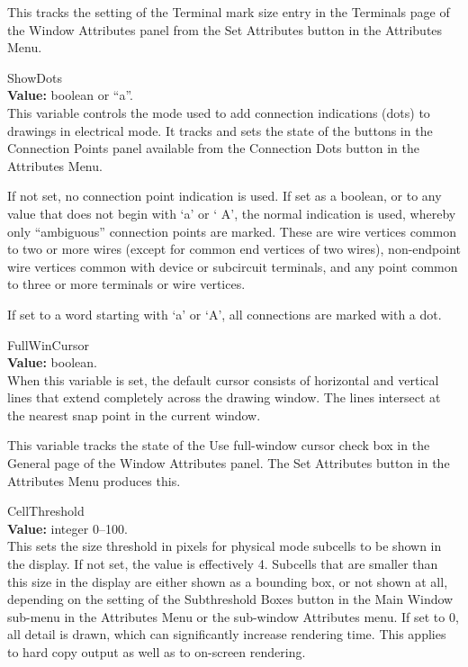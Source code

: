 \begin{description}
This tracks the setting of the {\cb Terminal mark size} entry in the
{\cb Terminals} page of the {\cb Window Attributes} panel from the
{\cb Set Attributes} button in the {\cb Attributes Menu}.

\item{\et ShowDots}\\
{\bf Value:} boolean or ``{\vt a}''.\\
This variable controls the mode used to add connection indications
(dots) to drawings in electrical mode.  It tracks and sets the state
of the buttons in the {\cb Connection Points} panel available from the
{\cb Connection Dots} button in the {\cb Attributes Menu}.

If not set, no connection point indication is used.  If set as a
boolean, or to any value that does not begin with `{\vt a}' or `{\vt
A}', the normal indication is used, whereby only ``ambiguous''
connection points are marked.  These are wire vertices common to two
or more wires (except for common end vertices of two wires),
non-endpoint wire vertices common with device or subcircuit terminals,
and any point common to three or more terminals or wire vertices.

If set to a word starting with `{\vt a}' or `{\vt A}', all connections
are marked with a dot.

\item{\et FullWinCursor}\\
{\bf Value:} boolean.\\
When this variable is set, the default cursor consists of horizontal
and vertical lines that extend completely across the drawing window. 
The lines intersect at the nearest snap point in the current window.

This variable tracks the state of the {\cb Use full-window cursor}
check box in the {\cb General} page of the {\cb Window Attributes}
panel.  The {\cb Set Attributes} button in the {\cb Attributes Menu}
produces this.

\item{\et CellThreshold}\\
{\bf Value:} integer 0--100.\\
This sets the size threshold in pixels for physical mode subcells to
be shown in the display.  If not set, the value is effectively 4. 
Subcells that are smaller than this size in the display are either
shown as a bounding box, or not shown at all, depending on the setting
of the {\cb Subthreshold Boxes} button in the {\cb Main Window}
sub-menu in the {\cb Attributes Menu} or the sub-window {\cb
Attributes} menu.  If set to 0, all detail is drawn, which can
significantly increase rendering time.  This applies to hard copy
output as well as to on-screen rendering.


\end{description}
